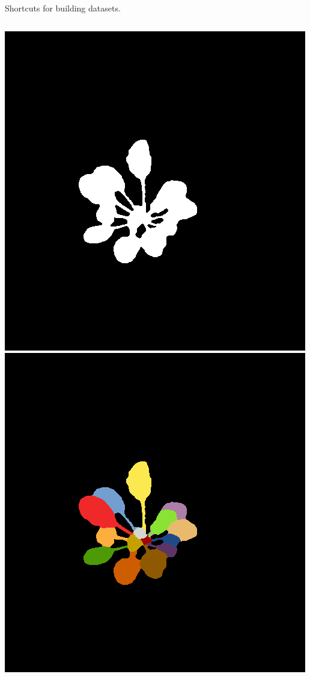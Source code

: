 \begin{frame}{Shortcuts for building datasets.}
\begin{columns}
\begin{column}{0.65\textwidth}
{\begin{columns}
\begin{column}{0.3\textwidth}
\includegraphics[width=\linewidth]{pics/fg}\\\includegraphics[width=\linewidth]{pics/label} 

\end{column}
\end{columns}}
\end{column}
\end{columns}
\end{frame}
